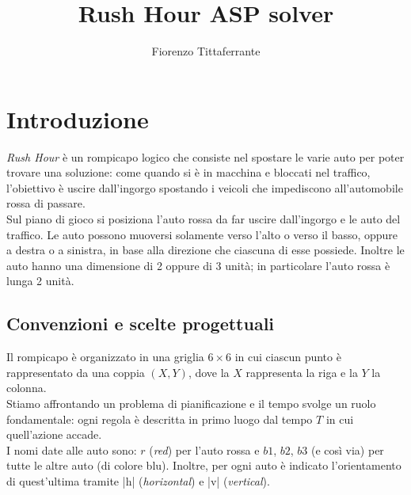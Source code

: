 \documentclass[10pt, a4paper, oneside]{article}
\title{Rush Hour ASP solver}
\author{Fiorenzo Tittaferrante}
\begin{document}
\maketitle



\section{Introduzione}
\emph{Rush Hour} è un rompicapo logico che consiste nel spostare le varie auto per poter trovare una soluzione: come quando si è in macchina e bloccati nel traffico, l'obiettivo è uscire dall'ingorgo spostando i veicoli che impediscono all’automobile rossa di passare. \\

\noindent
Sul piano di gioco si posiziona l’auto rossa da far uscire dall’ingorgo e le auto del traffico. Le auto possono muoversi solamente verso l'alto o verso il basso, oppure a destra o a sinistra, in base alla direzione che ciascuna di esse possiede. Inoltre le auto hanno una dimensione di 2 oppure di 3 unità; in particolare l'auto rossa è lunga 2 unità.


\subsection{Convenzioni e scelte progettuali}\label{subsec:scelte_progettuali}
Il rompicapo è organizzato in una griglia $6\times6$ in cui ciascun punto è rappresentato da una coppia $(X,Y)$, dove la $X$ rappresenta la riga e la $Y$ la colonna. \\

\noindent
Stiamo affrontando un problema di pianificazione e il tempo svolge un ruolo fondamentale: ogni regola è descritta in primo luogo dal tempo $T$ in cui quell'azione accade. \\

\noindent
I nomi date alle auto sono: $r$ (\emph{red}) per l'auto rossa e $b1$, $b2$, $b3$ (e così via) per tutte le altre auto (di colore blu). Inoltre, per ogni auto è indicato l'orientamento di quest'ultima tramite |h| (\emph{horizontal}) e |v| (\emph{vertical}). \\
\end{document}
